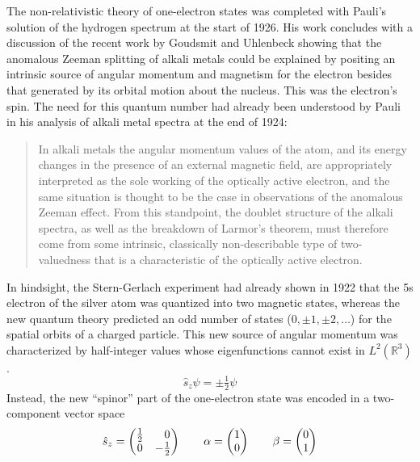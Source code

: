 The non-relativistic theory of one-electron states was completed with Pauli's
solution of the hydrogen spectrum at the start of 1926.\cite{Pauli:1926p336}
His work concludes with a discussion of the recent work by Goudsmit and
Uhlenbeck\cite{Uhlenbeck:1925p953} showing that the anomalous Zeeman splitting
of alkali metals could be explained by positing an intrinsic source of angular
momentum and magnetism for the electron besides that generated by its orbital
motion about the nucleus.
This was the electron's spin.
The need for this quantum number had already been understood by Pauli in his
analysis of alkali metal spectra at the end of 1924:
\begin{quote}
    In alkali metals the angular momentum values of the atom, and its energy
    changes in the presence of an external magnetic field, are appropriately
    interpreted as the sole working of the optically active electron, and the
    same situation is thought to be the case in observations of the anomalous
    Zeeman effect.
    From this standpoint, the doublet structure of the alkali
    spectra, as well as the breakdown of Larmor's theorem, must
    therefore come from some intrinsic, classically non-describable
    type of two-valuedness that is a characteristic of the optically
    active electron.\cite{Pauli:1925p373}
\end{quote}
In hindsight, the Stern-Gerlach experiment\cite{Gerlach:1922p349} had already
shown in 1922 that the 5s electron of the silver atom was quantized into two
magnetic states, whereas the new quantum theory predicted an odd number of
states (\(0, \pm1, \pm2, \dots\)) for the spatial orbits of a charged particle.
This new source of angular momentum was characterized by half-integer values
whose eigenfunctions cannot exist in \(L^2(\mathbb{R}^3)\).
\begin{equation}
    \hat{s}_z
    \psi
    =
    \pm
    \tfrac{1}{2}
    \psi
\end{equation}
Instead, the new ``spinor'' part of the one-electron state was encoded in a
two-component vector space
\begin{equation}
    \hat{s}_z
    =
    \begin{pmatrix}
        \tfrac{1}{2} & \hphantom{+}0 \\
        0 & -\tfrac{1}{2}
    \end{pmatrix}
    \qquad
    \alpha
    =
    \begin{pmatrix}
        1 \\ 0
    \end{pmatrix}
    \qquad
    \beta
    =
    \begin{pmatrix}
        0 \\ 1
    \end{pmatrix}
\end{equation}
